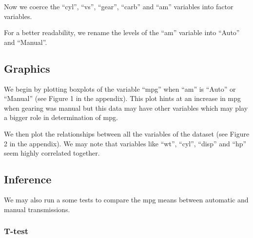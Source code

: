 \documentclass[a3paper]{article}
\newenvironment{Shaded}{\begin{snugshade}}{\end{snugshade}}
\newcommand{\KeywordTok}[1]{\textcolor[rgb]{0.13,0.29,0.53}{\textbf{{#1}}}}
\newcommand{\StringTok}[1]{\textcolor[rgb]{0.31,0.60,0.02}{{#1}}}
\newcommand{\NormalTok}[1]{{#1}}
\begin{document}
Now we coerce the ``cyl'', ``vs'', ``gear'', ``carb'' and ``am''
variables into factor variables.

\begin{Shaded}
\end{Shaded}

For a better readability, we rename the levels of the ``am'' variable
into ``Auto'' and ``Manual''.

\begin{Shaded}
\end{Shaded}

\subsection{Graphics}\label{graphics}

We begin by plotting boxplots of the variable ``mpg'' when ``am'' is
``Auto'' or ``Manual'' (see Figure 1 in the appendix). This plot hints
at an increase in mpg when gearing was manual but this data may have
other variables which may play a bigger role in determination of mpg.

We then plot the relationships between all the variables of the dataset
(see Figure 2 in the appendix). We may note that variables like ``wt'',
``cyl'', ``disp'' and ``hp'' seem highly correlated together.

\subsection{Inference}\label{inference}

We may also run a some tests to compare the mpg means between automatic
and manual transmissions.

\subsubsection{T-test}\label{t-test}
\end{document}

